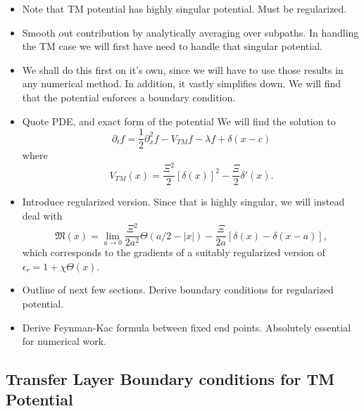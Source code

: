 \begin{itemize}
  \item {Note that TM potential has highly singular potential.  Must be regularized.}
  \item Smooth out contribution by analytically averaging over subpaths.
    In handling the TM case we will first have need to handle that singular potential.
  \item We shall do this first on it's own, since we will have to use those results in any numerical method.
    In addition, it vastly simplifies down.
    We will find that the potential enforces a boundary condition.  

  \item Quote PDE, and exact form of the potential
    We will find the solution to 
    \begin{equation}
      \partial_t f = \frac{1}{2}\partial_x^2f -V_{TM} f - \lambda f + \delta(x-c)
    \end{equation}
    where 
    \begin{equation}
      V_{TM}(x) = \frac{\Xi^2}{2}[\delta(x)]^2 - \frac{\Xi}{2}\delta'(x).
    \end{equation}
  \item Introduce regularized version.  
    Since that is highly singular, we will instead deal with 
    \begin{equation}
      \mathfrak{M}(x) = \lim_{a\rightarrow 0} \frac{\Xi^2}{2a^2}\Theta(a/2-|x|) - \frac{\Xi}{2a}[\delta(x)-\delta(x-a)],
    \end{equation}
    which corresponds to the gradients of a suitably regularized version of $\epsilon_r = 1+\chi\Theta(x)$.  
  \item Outline of next few sections.  Derive boundary conditions for regularized potential.  
  \item Derive Feynman-Kac formula between fixed end points.  Absolutely essential for numerical
    work.
\end{itemize}

\subsection{Transfer Layer Boundary conditions for TM Potential}

